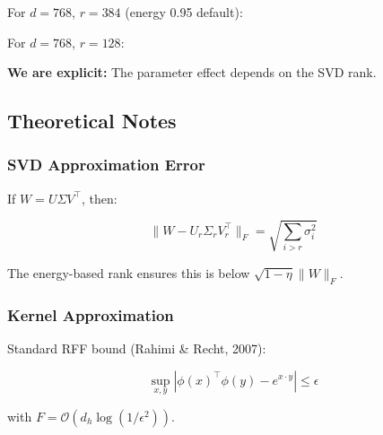 For $d = 768$, $r = 384$ (energy 0.95 default):
For $d = 768$, $r = 128$:
\textbf{We are explicit:} The parameter effect depends on the SVD rank.

\subsection{Theoretical Notes}

\subsubsection{SVD Approximation Error}

If $W = U\Sigma V^\top$, then:

\begin{equation}
\|W - U_r \Sigma_r V_r^\top\|_F = \sqrt{\sum_{i > r} \sigma_i^2}
\end{equation}

The energy-based rank ensures this is below $\sqrt{1 - \eta} \|W\|_F$.

\subsubsection{Kernel Approximation}

Standard RFF bound (Rahimi \& Recht, 2007):

\begin{equation}
\sup_{x, y} |\phi(x)^\top \phi(y) - e^{x \cdot y}| \leq \epsilon
\end{equation}

with $F = \mathcal{O}(d_h \log(1/\epsilon^2))$.

